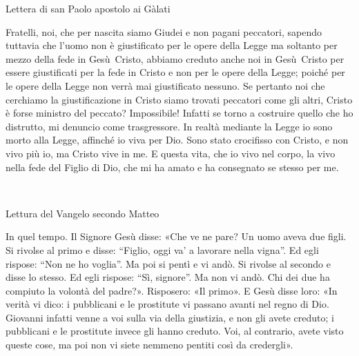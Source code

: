 \documentclass[leaflet,rite=ambrosian,litcolor=red,biblerefstyle=CEI]{missa}
\newcommand{\TODO}{\makecolorbox{green}{\textcolor{red}{TODO}}}
\begin{document}
Lettera di san Paolo apostolo ai Gàlati

Fratelli, noi, che per nascita siamo Giudei e non pagani peccatori, sapendo tuttavia che l'uomo non è giustificato per le opere della Legge ma soltanto per mezzo della fede in Gesù~Cristo, abbiamo creduto anche noi in Gesù~Cristo per essere giustificati per la fede in Cristo e non per le opere della Legge; poiché per le opere della Legge non verrà mai giustificato nessuno. Se pertanto noi che cerchiamo la giustificazione in Cristo siamo trovati peccatori come gli altri, Cristo è forse ministro del peccato? Impossibile! Infatti se torno a costruire quello che ho distrutto, mi denuncio come trasgressore. In realtà mediante la Legge io sono morto alla Legge, affinché io viva per Dio. Sono stato crocifisso con Cristo, e non vivo più io, ma Cristo vive in me. E questa vita, che io vivo nel corpo, la vivo nella fede del Figlio di Dio, che mi ha amato e ha consegnato se stesso per me.

\twotl%

\all{\tbtg}

\moment[\TODO Cf~\bibleverse{Matthew}(8:11)~(\cantemus{40})]{Canto al Vangelo} %

\all{\alleluia}

~\R



Lettura del Vangelo secondo Matteo

\all{\gtyl}

In quel tempo. Il Signore Gesù disse: «Che ve ne pare? Un uomo aveva due figli. Si rivolse al primo e disse: ``Figlio, oggi va' a lavorare nella vigna''. Ed egli rispose: ``Non ne ho voglia''. Ma poi si pentì e vi andò. Si rivolse al secondo e disse lo stesso. Ed egli rispose: ``Sì, signore''. Ma non vi andò. Chi dei due ha compiuto la volontà del padre?». Risposero: «Il primo». E Gesù disse loro: «In verità vi dico: i pubblicani e le prostitute vi passano avanti nel regno di Dio. Giovanni infatti venne a voi sulla via della giustizia, e non gli avete creduto; i pubblicani e le prostitute invece gli hanno creduto. Voi, al contrario, avete visto queste cose, ma poi non vi siete nemmeno pentiti così da credergli».
\end{document}
